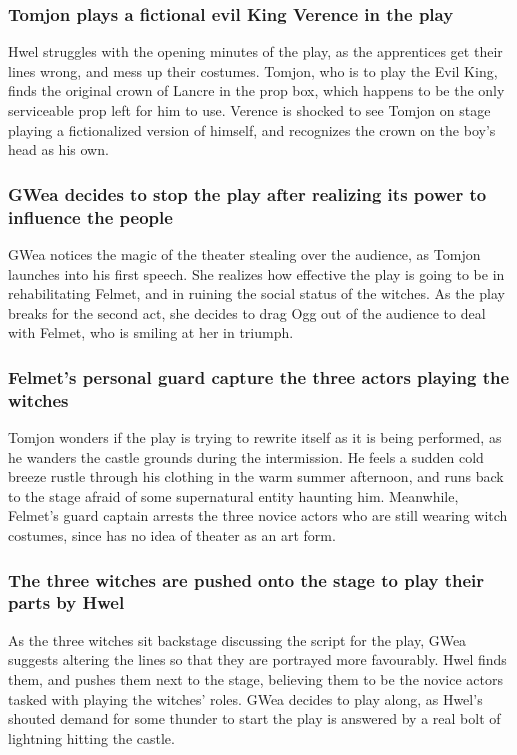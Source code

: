 \subsubsection{\Gls{Tomjon} plays a fictional evil King \Gls{Verence} in the play}
\Gls{Hwel} struggles with the opening minutes of the play, as the apprentices get their lines wrong,
and mess up their costumes. \Gls{Tomjon}, who is to play the Evil King, finds the original crown of
Lancre in the prop box, which happens to be the only serviceable prop left for him to use.
\Gls{Verence} is shocked to see \Gls{Tomjon} on stage playing a fictionalized version of himself,
and recognizes the crown on the boy's head as his own.

\subsubsection{\Gls{GWea} decides to stop the play after realizing its power to influence the
    people}
\Gls{GWea} notices the magic of the theater stealing over the audience, as \Gls{Tomjon} launches
into his first speech. She realizes how effective the play is going to be in rehabilitating
\Gls{Felmet}, and in ruining the social status of the witches. As the play breaks for the second
act, she decides to drag \Gls{Ogg} out of the audience to deal with \Gls{Felmet}, who is smiling at
her in triumph.

\subsubsection{\Gls{Felmet}'s personal guard capture the three actors playing the witches}
\Gls{Tomjon} wonders if the play is trying to rewrite itself as it is being performed, as he wanders
the castle grounds during the intermission. He feels a sudden cold breeze rustle through his
clothing in the warm summer afternoon, and runs back to the stage afraid of some supernatural
entity haunting him. Meanwhile, \Gls{Felmet}'s guard captain arrests the three novice actors who
are still wearing witch costumes, since has no idea of theater as an art form.

\subsubsection{The three witches are pushed onto the stage to play their parts by \Gls{Hwel}}
As the three witches sit backstage discussing the script for the play, \Gls{GWea} suggests altering
the lines so that they are portrayed more favourably. \Gls{Hwel} finds them, and pushes them next
to the stage, believing them to be the novice actors tasked with playing the witches' roles.
\Gls{GWea} decides to play along, as \Gls{Hwel}'s shouted demand for some thunder to start the play
is answered by a real bolt of lightning hitting the castle.

